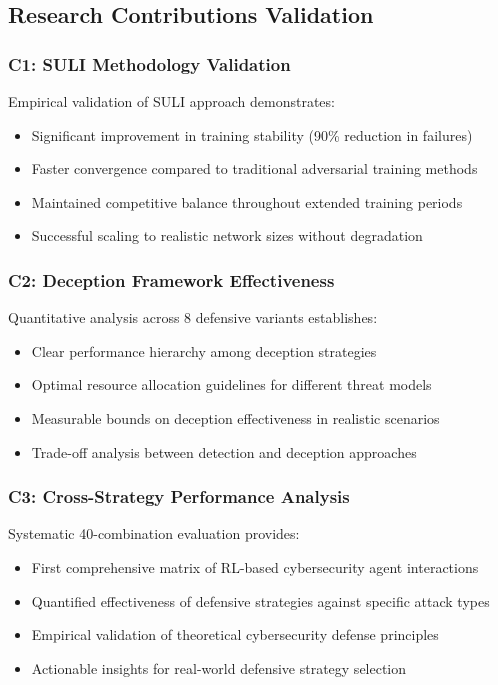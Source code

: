 \documentclass[11pt]{article}
\theoremstyle{definition}
\theoremstyle{plain}
\begin{document}
\subsection{Research Contributions Validation}

\subsubsection{C1: SULI Methodology Validation}
Empirical validation of SULI approach demonstrates:
\begin{itemize}
\item Significant improvement in training stability (90\% reduction in failures)
\item Faster convergence compared to traditional adversarial training methods
\item Maintained competitive balance throughout extended training periods
\item Successful scaling to realistic network sizes without degradation
\end{itemize}

\subsubsection{C2: Deception Framework Effectiveness}
Quantitative analysis across 8 defensive variants establishes:
\begin{itemize}
\item Clear performance hierarchy among deception strategies
\item Optimal resource allocation guidelines for different threat models
\item Measurable bounds on deception effectiveness in realistic scenarios
\item Trade-off analysis between detection and deception approaches
\end{itemize}

\subsubsection{C3: Cross-Strategy Performance Analysis}
Systematic 40-combination evaluation provides:
\begin{itemize}
\item First comprehensive matrix of RL-based cybersecurity agent interactions
\item Quantified effectiveness of defensive strategies against specific attack types
\item Empirical validation of theoretical cybersecurity defense principles
\item Actionable insights for real-world defensive strategy selection
\end{itemize}
\end{document}
